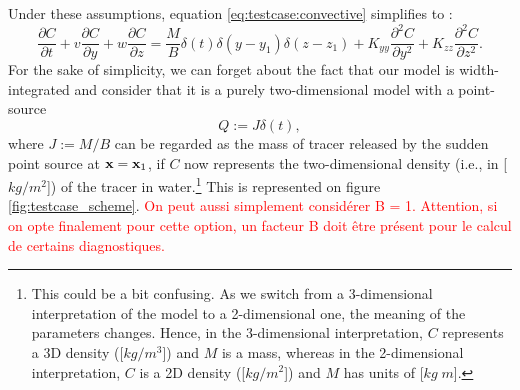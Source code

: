 Under these assumptions, equation \eqref{eq:testcase:convective} simplifies to :
\begin{equation} \label{eq:testcase}
	\frac{\partial C}{\partial t} + v \frac{\partial C}{\partial y} + w \frac{\partial C}{\partial z} = \frac{M}{B} \delta(t) \delta(y - y_1)\delta(z-z_1) + K_{yy} \frac{\partial^2 C}{\partial y^2} + K_{zz} \frac{\partial^2 C}{\partial z^2}.
\end{equation}
For the sake of simplicity, we can forget about the fact that our model is width-integrated and consider that it is a purely two-dimensional model with a point-source
\begin{equation}
	Q := J\delta(t),
\end{equation}
where $J := M/B$ can be regarded as the mass of tracer released by the sudden point source at $\mathbf x = \mathbf x_1$, if $C$ now represents the two-dimensional density (i.e., in [$kg/m^2$]) of the tracer in water.\footnote{This could be a bit confusing. As we switch from a 3-dimensional interpretation of the model to a 2-dimensional one, the meaning of the parameters changes. Hence, in the 3-dimensional interpretation, $C$ represents a 3D density ([$kg/m^3$]) and $M$ is a mass, whereas in the 2-dimensional interpretation, $C$ is a 2D density ([$kg/m^2$]) and $M$ has units of [$kg\;m$].} This is represented on figure \ref{fig:testcase_scheme}. \textcolor{red}{On peut aussi simplement considérer B = 1. Attention, si on opte finalement pour cette option, un facteur B doit être présent pour le calcul de certains diagnostiques.}
